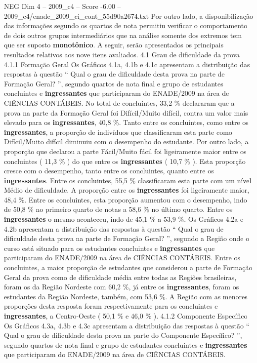 \begin{textsample}{NEG Dim 4 – 2009\_c4 – Score -6.00 – 2009\_c4/enade\_2009\_ci\_cont\_55d90a2674.txt}
Por outro lado, a disponibilização das informações segundo os quartos de nota permitiu verificar o comportamento de dois outros grupos intermediários que na análise somente dos extremos tem que ser suposto \textbf{monotônico}.
A seguir, serão apresentados os principais resultados relativos aos nove itens avaliados. 4.1 Grau de dificuldade da prova 4.1.1 Formação Geral Os Gráficos 4.1a, 4.1b e 4.1c apresentam a distribuição das respostas à questão “ Qual o grau de dificuldade desta prova na parte de Formação Geral? ”, segundo quartos de nota final e grupo de estudantes concluintes e \textbf{ingressantes} que participaram do ENADE/2009 na área de CIÊNCIAS CONTÁBEIS.
No total de concluintes, 33,2 \% declararam que a prova na parte da Formação Geral foi Difícil/Muito difícil, contra um valor mais elevado para os \textbf{ingressantes}, 40,8 \%.
Tanto entre os concluintes, como entre os \textbf{ingressantes}, a proporção de indivíduos que classificaram esta parte como Difícil/Muito difícil diminuiu com o desempenho do estudante.
Por outro lado, a proporção que declarou a parte Fácil/Muito fácil foi ligeiramente maior entre os concluintes ( 11,3 \% ) do que entre os \textbf{ingressantes} ( 10,7 \% ).
Esta proporção cresce com o desempenho, tanto entre os concluintes, quanto entre os \textbf{ingressantes}.
Entre os concluintes, 55,5 \% classificaram esta parte com um nível Médio de dificuldade.
A proporção entre os \textbf{ingressantes} foi ligeiramente maior, 48,4 \%.
Entre os concluintes, esta proporção aumentou com o desempenho, indo de 50,8 \% no primeiro quarto de notas a 58,6 \% no último quarto.
Entre os \textbf{ingressantes} o mesmo aconteceu, indo de 45,1 \% a 53,9 \%.
Os Gráficos 4.2a e 4.2b apresentam a distribuição das respostas à questão “ Qual o grau de dificuldade desta prova na parte de Formação Geral? ”, segundo a Região onde o curso está situado para os estudantes concluintes e \textbf{ingressantes} que participaram do ENADE/2009 na área de CIÊNCIAS CONTÁBEIS.
Entre os concluintes, a maior proporção de estudantes que considerou a parte de Formação Geral da prova como de dificuldade média entre todas as Regiões brasileiras, foram os da Região Nordeste com 60,2 \%, já entre os \textbf{ingressantes}, foram os estudantes da Região Nordeste, também, com 53,6 \%.
A Região com as menores proporções desta resposta foram respectivamente para os concluintes e \textbf{ingressantes}, a Centro-Oeste ( 50,1 \% e 46,0 \% ). 4.1.2 Componente Específico Os Gráficos 4.3a, 4.3b e 4.3c apresentam a distribuição das respostas à questão “ Qual o grau de dificuldade desta prova na parte do Componente Específico? ”, segundo quartos de nota final e grupo de estudantes concluintes e \textbf{ingressantes} que participaram do ENADE/2009 na área de CIÊNCIAS CONTÁBEIS.

\end{textsample}
